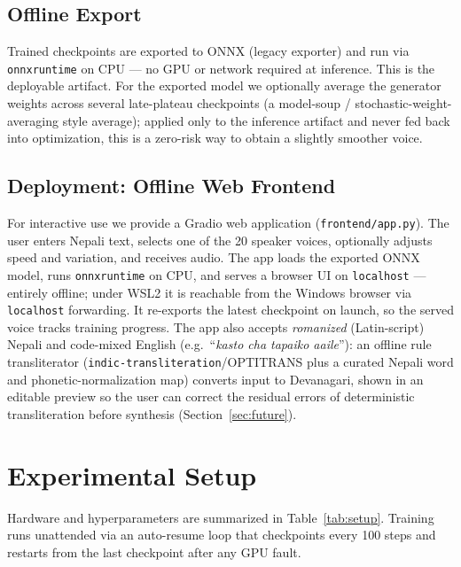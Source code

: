 \documentclass[conference]{IEEEtran}
\begin{document}
\subsection{Offline Export}
Trained checkpoints are exported to ONNX (legacy exporter) and run via \texttt{onnxruntime} on CPU --- no GPU
or network required at inference. This is the deployable artifact. For the exported model we optionally average
the generator weights across several late-plateau checkpoints (a model-soup / stochastic-weight-averaging style
average); applied only to the inference artifact and never fed back into optimization, this is a zero-risk way
to obtain a slightly smoother voice.

\subsection{Deployment: Offline Web Frontend}
For interactive use we provide a Gradio web application (\texttt{frontend/app.py}). The user enters Nepali
text, selects one of the 20 speaker voices, optionally adjusts speed and variation, and receives audio. The
app loads the exported ONNX model, runs \texttt{onnxruntime} on CPU, and serves a browser UI on
\texttt{localhost} --- entirely offline; under WSL2 it is reachable from the Windows browser via
\texttt{localhost} forwarding. It re-exports the latest checkpoint on launch, so the served voice tracks
training progress. The app also accepts \emph{romanized} (Latin-script) Nepali and code-mixed English
(e.g.\ ``\textit{kasto cha tapaiko aaile}''): an offline rule transliterator
(\texttt{indic-transliteration}/OPTITRANS plus a curated Nepali word and phonetic-normalization map) converts
input to Devanagari, shown in an editable preview so the user can correct the residual errors of deterministic
transliteration before synthesis (Section~\ref{sec:future}).

\section{Experimental Setup}
Hardware and hyperparameters are summarized in Table~\ref{tab:setup}. Training runs unattended via an
auto-resume loop that checkpoints every 100 steps and restarts from the last checkpoint after any GPU fault.
\end{document}
